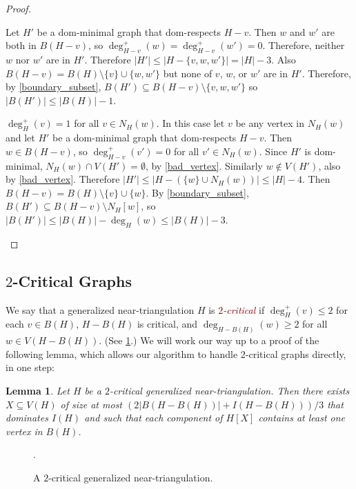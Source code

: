 \documentclass[12pt]{article}
\newtheorem{lem}{Lemma}
\newcommand{\defin}[1]{\emph{\textcolor{Maroon}{#1}}}
\theoremstyle{definition}
\newcommand{\pat}[1]{[\textcolor{red}{PM: #1}]}
\begin{document}
\begin{proof}
\begin{compactenum}[(a)]
    Let $H'$ be a dom-minimal graph that dom-respects $H-v$. Then $w$ and $w'$ are both in $B(H-v)$, so $\deg^+_{H-v}(w)=\deg^+_{H-v}(w')=0$. Therefore, neither $w$ nor $w'$ are in $H'$. Therefore $|H'|\le |H-\{v,w,w'\}|=|H|-3$.  Also $B(H-v)=B(H)\setminus\{v\}\cup\{w,w'\}$ but none of $v$, $w$, or $w'$ are in $H'$.  Therefore, by \cref{boundary_subset}, $B(H')\subseteq B(H-v)\setminus\{v,w,w'\}$ so $|B(H')|\le |B(H)|-1$.

    \item $\deg^+_H(v)=1$ for all $v\in N_H(w)$.  In this case let $v$ be any vertex in $N_H(w)$ and let $H'$ be a dom-minimal graph that dom-respects $H-v$.  Then $w\in B(H-v)$, so $\deg^+_{H-v}(v')=0$ for all $v'\in N_H(w)$. Since $H'$ is dom-minimal, $N_H(w)\cap V(H')=\emptyset$, by \cref{bad_vertex}.  Similarly $w\not\in V(H')$, also by \cref{bad_vertex}. Therefore $|H'|\le |H-(\{w\}\cup N_H(w))| \le |H|-4$. Then $B(H-v)=B(H)\setminus\{v\}\cup\{w\}$.
    By \cref{boundary_subset}, $B(H')\subseteq B(H-v)\setminus N_H[w]$, so $|B(H')|\le |B(H)|-\deg_H(w) \le |B(H)|-3$. \qedhere
  \end{compactenum}
\end{proof}



\subsection{$2$-Critical Graphs}


We say that a generalized near-triangulation $H$ is \defin{$2$-critical} if $\deg^+_H(v)\le 2$ for each $v\in B(H)$,  $H-B(H)$ is critical, and $\deg_{H-B(H)}(w)\ge 2$ for all $w\in V(H-B(H))$.  (See \cref{two_critical_figure}.)
We will work our way up to a proof of the following lemma, which allows our algorithm to handle $2$-critical graphs directly, in one step:

\begin{lem}\label{two_critical_handler}
  Let $H$ be a $2$-critical generalized near-triangulation.  Then there exists $X\subseteq V(H)$ of size at most $(2|B(H-B(H))| + I(H-B(H)))/3$ that dominates $I(H)$ and such that each component of $H[X]$ contains at least one vertex in $B(H)$.
\end{lem}

\begin{figure}[htbp]
  \centering
  \pat{Update this figure}.
  \caption{A $2$-critical generalized near-triangulation.}
  \label{two_critical_figure}
\end{figure}
\end{document}
